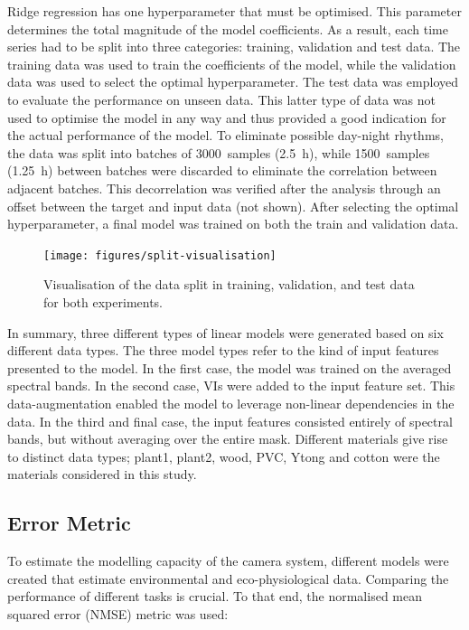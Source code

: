 \documentclass[10pt,authoryear,a4paper]{elsarticle}
\begin{document}
        Ridge regression has one hyperparameter that must be optimised. This parameter determines the total magnitude of the model coefficients. As a result, each time series had to be split into three categories: training, validation and test data. The training data was used to train the coefficients of the model, while the validation data was used to select the optimal hyperparameter. The test data was employed to evaluate the performance on unseen data. This latter type of data was not used to optimise the model in any way and thus provided a good indication for the actual performance of the model. To eliminate possible day-night rhythms, the data was split into batches of 3000~samples (\SI{2.5}{\hour}), while 1500~samples (\SI{1.25}{\hour}) between batches were discarded to eliminate the correlation between adjacent batches. This decorrelation was verified after the analysis through an offset between the target and input data (not shown). After selecting the optimal hyperparameter, a final model was trained on both the train and validation data.
        
        \begin{figure}[thb]
            \centering
            \texttt{[image: figures/split-visualisation]}            
            \caption{Visualisation of the data split in training, validation, and test data for both experiments.}
            \label{data-split}
        \end{figure}
        
        In summary, three different types of linear models were generated based on six different data types. The three model types refer to the kind of input features presented to the model. In the first case, the model was trained on the averaged spectral bands. In the second case, VIs were added to the input feature set. This data-augmentation enabled the model to leverage non-linear dependencies in the data. In the third and final case, the input features consisted entirely of spectral bands, but without averaging over the entire mask. Different materials give rise to distinct data types; plant1, plant2, wood, PVC, Ytong and cotton were the materials considered in this study.
        
    \subsection{Error Metric}
        
        To estimate the modelling capacity of the camera system, different models were created that estimate environmental and eco-physiological data. Comparing the performance of different tasks is crucial. To that end, the normalised mean squared error (NMSE) metric was used:
        
\end{document}
